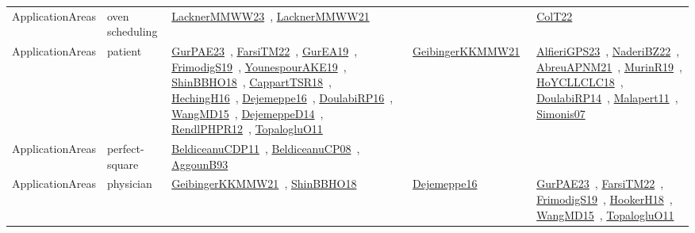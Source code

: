 {\begin{longtable}{lp{3cm}>{\raggedright\arraybackslash}p{6cm}>{\raggedright\arraybackslash}p{6cm}>{\raggedright\arraybackslash}p{8cm}}
ApplicationAreas & oven scheduling & \href{works/LacknerMMWW23.pdf}{LacknerMMWW23}~\cite{LacknerMMWW23}, \href{works/LacknerMMWW21.pdf}{LacknerMMWW21}~\cite{LacknerMMWW21} &  & \href{works/ColT22.pdf}{ColT22}~\cite{ColT22}\\
ApplicationAreas & patient & \href{works/GurPAE23.pdf}{GurPAE23}~\cite{GurPAE23}, \href{works/FarsiTM22.pdf}{FarsiTM22}~\cite{FarsiTM22}, \href{works/GurEA19.pdf}{GurEA19}~\cite{GurEA19}, \href{works/FrimodigS19.pdf}{FrimodigS19}~\cite{FrimodigS19}, \href{works/YounespourAKE19.pdf}{YounespourAKE19}~\cite{YounespourAKE19}, \href{works/ShinBBHO18.pdf}{ShinBBHO18}~\cite{ShinBBHO18}, \href{works/CappartTSR18.pdf}{CappartTSR18}~\cite{CappartTSR18}, \href{works/HechingH16.pdf}{HechingH16}~\cite{HechingH16}, \href{works/Dejemeppe16.pdf}{Dejemeppe16}~\cite{Dejemeppe16}, \href{works/DoulabiRP16.pdf}{DoulabiRP16}~\cite{DoulabiRP16}, \href{works/WangMD15.pdf}{WangMD15}~\cite{WangMD15}, \href{works/DejemeppeD14.pdf}{DejemeppeD14}~\cite{DejemeppeD14}, \href{works/RendlPHPR12.pdf}{RendlPHPR12}~\cite{RendlPHPR12}, \href{works/TopalogluO11.pdf}{TopalogluO11}~\cite{TopalogluO11} & \href{works/GeibingerKKMMW21.pdf}{GeibingerKKMMW21}~\cite{GeibingerKKMMW21} & \href{works/AlfieriGPS23.pdf}{AlfieriGPS23}~\cite{AlfieriGPS23}, \href{works/NaderiBZ22.pdf}{NaderiBZ22}~\cite{NaderiBZ22}, \href{works/AbreuAPNM21.pdf}{AbreuAPNM21}~\cite{AbreuAPNM21}, \href{works/MurinR19.pdf}{MurinR19}~\cite{MurinR19}, \href{works/HoYCLLCLC18.pdf}{HoYCLLCLC18}~\cite{HoYCLLCLC18}, \href{works/DoulabiRP14.pdf}{DoulabiRP14}~\cite{DoulabiRP14}, \href{works/Malapert11.pdf}{Malapert11}~\cite{Malapert11}, \href{works/Simonis07.pdf}{Simonis07}~\cite{Simonis07}\\
ApplicationAreas & perfect-square & \href{works/BeldiceanuCDP11.pdf}{BeldiceanuCDP11}~\cite{BeldiceanuCDP11}, \href{works/BeldiceanuCP08.pdf}{BeldiceanuCP08}~\cite{BeldiceanuCP08}, \href{works/AggounB93.pdf}{AggounB93}~\cite{AggounB93} &  & \\
ApplicationAreas & physician & \href{works/GeibingerKKMMW21.pdf}{GeibingerKKMMW21}~\cite{GeibingerKKMMW21}, \href{works/ShinBBHO18.pdf}{ShinBBHO18}~\cite{ShinBBHO18} & \href{works/Dejemeppe16.pdf}{Dejemeppe16}~\cite{Dejemeppe16} & \href{works/GurPAE23.pdf}{GurPAE23}~\cite{GurPAE23}, \href{works/FarsiTM22.pdf}{FarsiTM22}~\cite{FarsiTM22}, \href{works/FrimodigS19.pdf}{FrimodigS19}~\cite{FrimodigS19}, \href{works/HookerH18.pdf}{HookerH18}~\cite{HookerH18}, \href{works/WangMD15.pdf}{WangMD15}~\cite{WangMD15}, \href{works/TopalogluO11.pdf}{TopalogluO11}~\cite{TopalogluO11}\\

\end{longtable}}
